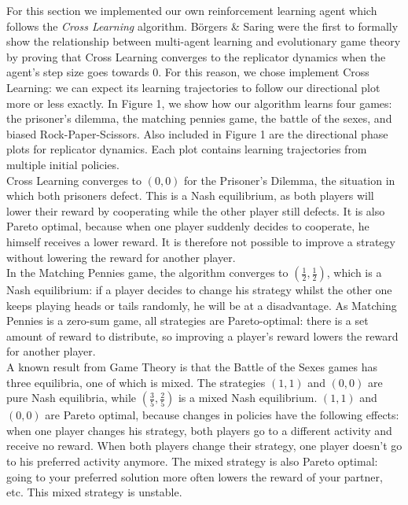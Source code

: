 \documentclass[10pt,a4paper]{article}
\begin{document}
For this section we implemented our own reinforcement learning agent which follows the \textit{Cross Learning} algorithm. B\"{o}rgers \& Saring were the first to formally show the relationship between multi-agent learning and evolutionary game theory by proving that Cross Learning converges to the replicator dynamics when the agent's step size goes towards 0. For this reason, we chose implement Cross Learning: we can expect its learning trajectories to follow our directional plot more or less exactly. In Figure 1, we show how our algorithm learns four games: the prisoner's dilemma, the matching pennies game, the battle of the sexes, and biased Rock-Paper-Scissors. Also included in Figure 1 are the directional phase plots for replicator dynamics. Each plot contains learning trajectories from multiple initial policies.\\


Cross Learning converges to $(0,0)$ for the Prisoner's Dilemma, the situation in which both prisoners defect. This is a Nash equilibrium, as both players will lower their reward by cooperating while the other player still defects. It is also Pareto optimal, because when one player suddenly decides to cooperate, he himself receives a lower reward. It is therefore not possible to improve a strategy without lowering the reward for another player.\\

In the Matching Pennies game, the algorithm converges to $(\frac{1}{2},\frac{1}{2})$, which is a Nash equilibrium: if a player decides to change his strategy whilst the other one keeps playing heads or tails randomly, he will be at a disadvantage. As Matching Pennies is a zero-sum game, all strategies are Pareto-optimal: there is a set amount of reward to distribute, so improving a player's reward lowers the reward for another player.\\

A known result from Game Theory is that the Battle of the Sexes games has three equilibria, one of which is mixed. The strategies $(1,1)$ and $(0,0)$ are pure Nash equilibria, while $(\frac{3}{5},\frac{2}{5})$ is a mixed Nash equilibrium. $(1,1)$ and $(0,0)$ are Pareto optimal, because changes in policies have the following effects: when one player changes his strategy, both players go to a different activity and receive no reward. When both players change their strategy, one player doesn't go to his preferred activity anymore. The mixed strategy is also Pareto optimal: going to your preferred solution more often lowers the reward of your partner, etc. This mixed strategy is unstable.\\
\end{document}
